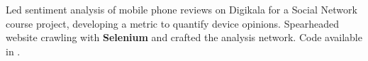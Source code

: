 \item{Led sentiment analysis of mobile phone reviews on Digikala for a Social Network course project, developing a metric to quantify device opinions. Spearheaded website crawling with \textbf{Selenium} and crafted the analysis network. Code available in .}

